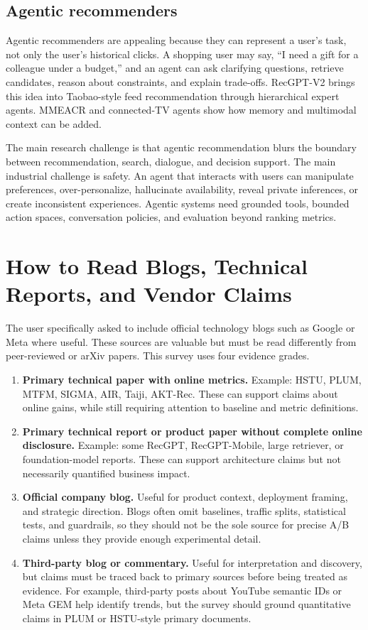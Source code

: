 \documentclass[11pt]{article}
\begin{document}
\subsection{Agentic recommenders}

Agentic recommenders are appealing because they can represent a user's task, not only the user's historical clicks. A shopping user may say, ``I need a gift for a colleague under a budget,'' and an agent can ask clarifying questions, retrieve candidates, reason about constraints, and explain trade-offs. RecGPT-V2 brings this idea into Taobao-style feed recommendation through hierarchical expert agents. MMEACR and connected-TV agents show how memory and multimodal context can be added.

The main research challenge is that agentic recommendation blurs the boundary between recommendation, search, dialogue, and decision support. The main industrial challenge is safety. An agent that interacts with users can manipulate preferences, over-personalize, hallucinate availability, reveal private inferences, or create inconsistent experiences. Agentic systems need grounded tools, bounded action spaces, conversation policies, and evaluation beyond ranking metrics.

\section{How to Read Blogs, Technical Reports, and Vendor Claims}

The user specifically asked to include official technology blogs such as Google or Meta where useful. These sources are valuable but must be read differently from peer-reviewed or arXiv papers. This survey uses four evidence grades.

\begin{enumerate}
  \item \textbf{Primary technical paper with online metrics.} Example: HSTU, PLUM, MTFM, SIGMA, AIR, Taiji, AKT-Rec. These can support claims about online gains, while still requiring attention to baseline and metric definitions.
  \item \textbf{Primary technical report or product paper without complete online disclosure.} Example: some RecGPT, RecGPT-Mobile, large retriever, or foundation-model reports. These can support architecture claims but not necessarily quantified business impact.
  \item \textbf{Official company blog.} Useful for product context, deployment framing, and strategic direction. Blogs often omit baselines, traffic splits, statistical tests, and guardrails, so they should not be the sole source for precise A/B claims unless they provide enough experimental detail.
  \item \textbf{Third-party blog or commentary.} Useful for interpretation and discovery, but claims must be traced back to primary sources before being treated as evidence. For example, third-party posts about YouTube semantic IDs or Meta GEM help identify trends, but the survey should ground quantitative claims in PLUM or HSTU-style primary documents.
\end{enumerate}
\end{document}
